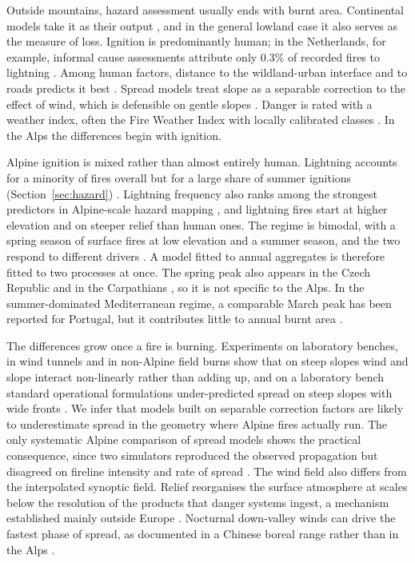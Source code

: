 \documentclass[11pt,a4paper]{article}
\begin{document}
Outside mountains, hazard assessment usually ends with burnt area. Continental models take it as their output \citep{forrest_understanding_2024}, and in the general lowland case it also serves as the measure of loss. Ignition is predominantly human; in the Netherlands, for example, informal cause assessments attribute only 0.3\% of recorded fires to lightning \citep{stoof_temperate_2024}. Among human factors, distance to the wildland-urban interface and to roads predicts it best \citep{gelabert_assessing_2025}. Spread models treat slope as a separable correction to the effect of wind, which is defensible on gentle slopes \citep{hayajneh_wind_2026}. Danger is rated with a weather index, often the Fire Weather Index with locally calibrated classes \citep{zacharakis_environmental_2023}. In the Alps the differences begin with ignition.

Alpine ignition is mixed rather than almost entirely human. Lightning accounts for a minority of fires overall but for a large share of summer ignitions (Section~\ref{sec:hazard}) \citep{valese_wildfires_2011}. Lightning frequency also ranks among the strongest predictors in Alpine-scale hazard mapping \citep{gerberding_mapping_2025}, and lightning fires start at higher elevation \citep{conedera_lightninginduced_2006, valese_wildfires_2011} and on steeper relief \citep{conedera_lightninginduced_2006} than human ones. The regime is bimodal, with a spring season of surface fires at low elevation and a summer season, and the two respond to different drivers \citep{valese_wildfires_2011, vacchiano_modeling_2018}. A model fitted to annual aggregates is therefore fitted to two processes at once. The spring peak also appears in the Czech Republic and in the Carpathians \citep{bercak_combination_2024, manczinger_fire_2025}, so it is not specific to the Alps. In the summer-dominated Mediterranean regime, a comparable March peak has been reported for Portugal, but it contributes little to annual burnt area \citep{bercak_combination_2024}.

The differences grow once a fire is burning. Experiments on laboratory benches, in wind tunnels and in non-Alpine field burns show that on steep slopes wind and slope interact non-linearly rather than adding up, and on a laboratory bench standard operational formulations under-predicted spread on steep slopes with wide fronts \citep{hayajneh_wind_2026}. We infer that models built on separable correction factors are likely to underestimate spread in the geometry where Alpine fires actually run. The only systematic Alpine comparison of spread models shows the practical consequence, since two simulators reproduced the observed propagation but disagreed on fireline intensity and rate of spread \citep{malanchini_modeling_2025}. The wind field also differs from the interpolated synoptic field. Relief reorganises the surface atmosphere at scales below the resolution of the products that danger systems ingest, a mechanism established mainly outside Europe \citep{sharples_overview_2009, ozaki_impact_2022}. Nocturnal down-valley winds can drive the fastest phase of spread, as documented in a Chinese boreal range rather than in the Alps \citep{wang_dynamic_2026}.
\end{document}
